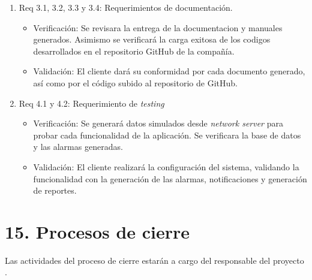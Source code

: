 \documentclass[
11pt, %
]{charter}
\begin{document}
\begin{enumerate}
\begin{itemize}
	\end{itemize}
	\item Req 3.1, 3.2, 3.3 y 3.4: Requerimientos de documentación.
	\begin{itemize}
		\item Verificación: Se revisara la entrega de la documentacion y manuales generados. Asimismo se verificará la carga exitosa de los codigos desarrollados en el repositorio GitHub de la compañía.
		\item Validación: El cliente dará su conformidad por cada documento generado, así como por el código subido al repositorio de GitHub.
	\end{itemize}
	\item Req 4.1 y 4.2: Requerimiento de \textit{testing}
	\begin{itemize}
		\item Verificación: Se generará datos simulados desde \textit{network server} para probar cada funcionalidad de la aplicación. Se verificara la base de datos y las alarmas generadas.
		\item Validación: El cliente realizará la configuración del sistema, validando la funcionalidad con la generación de las alarmas, notificaciones y generación de reportes.
	\end{itemize}
\end{enumerate}

\section{15. Procesos de cierre}    
\label{sec:cierre}
Las actividades del proceso de cierre estarán a cargo del responsable del proyecto \authorname.
\end{document}
